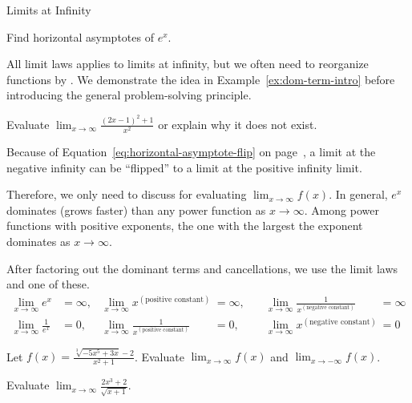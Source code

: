 \documentclass[../main.tex]{subfiles}
\begin{document}
\begin{lesson}{Limits at Infinity}
  \begin{example}
    Find horizontal asymptotes of \(e^{x}\).

  \end{example}

  All limit laws applies to limits at infinity, but we often need to reorganize functions by . We demonstrate the idea in Example~\ref{ex:dom-term-intro} before introducing the general problem-solving principle.

  \begin{example}\label{ex:dom-term-intro}
    Evaluate \(\lim_{x \to \infty} \frac{(2x-1)^{2} + 1}{x^{2}}\) or explain why it does not exist.

  \end{example}
  \clearpage

  Because of Equation~\eqref{eq:horizontal-asymptote-flip} on page~\pageref{eq:horizontal-asymptote-flip}, a limit at the negative infinity can be ``flipped'' to a limit at the positive infinity limit. 

  Therefore, we only need to discuss  for evaluating \(\lim_{x \to \infty} f(x)\). In general, \(e^{x}\) dominates (grows faster) than any power function as \(x \to \infty\). Among power functions with positive exponents, the one with the largest the exponent dominates as \(x \to \infty\).

  After factoring out the dominant terms and cancellations, we use the limit laws and one of these.
  \begin{align*}
    \lim_{x \to \infty} e^{x} &= \infty, & \lim_{x \to \infty} x^{(\text{positive constant})} &= \infty, & \quad \lim_{x \to \infty} \frac{1}{x^{(\text{negative constant})}} &= \infty \\
    \lim_{x \to \infty} \frac{1}{e^{x}} &= 0, & \lim_{x \to \infty} \frac{1}{x^{(\text{positive constant})}} &= 0, & \quad \lim_{x \to \infty} x^{(\text{negative constant})} &= 0
  \end{align*}

  \begin{example}
    Let \(f(x) = \frac{\sqrt[3]{-5x^{5} + 3x} - 2}{x^{2} + 1}\). 
    Evaluate \(\lim_{x \to \infty} f(x)\) and \(\lim_{x \to -\infty} f(x)\). 

  \end{example}

  \begin{example}
    Evaluate \(\lim_{x \to \infty} \frac{2x^{3} + 2}{\sqrt{x + 1}}\).
  \end{example}
  \clearpage


\end{lesson}
\end{document}
